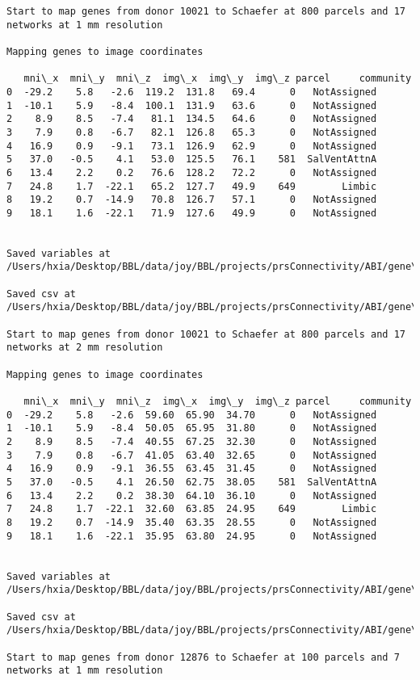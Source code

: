 \documentclass[11pt]{article}
\begin{document}
\begin{Verbatim}[commandchars=\\\{\}]
Start to map genes from donor 10021 to Schaefer at 800 parcels and 17 networks at 1 mm resolution

Mapping genes to image coordinates

   mni\_x  mni\_y  mni\_z  img\_x  img\_y  img\_z parcel     community
0  -29.2    5.8   -2.6  119.2  131.8   69.4      0   NotAssigned
1  -10.1    5.9   -8.4  100.1  131.9   63.6      0   NotAssigned
2    8.9    8.5   -7.4   81.1  134.5   64.6      0   NotAssigned
3    7.9    0.8   -6.7   82.1  126.8   65.3      0   NotAssigned
4   16.9    0.9   -9.1   73.1  126.9   62.9      0   NotAssigned
5   37.0   -0.5    4.1   53.0  125.5   76.1    581  SalVentAttnA
6   13.4    2.2    0.2   76.6  128.2   72.2      0   NotAssigned
7   24.8    1.7  -22.1   65.2  127.7   49.9    649        Limbic
8   19.2    0.7  -14.9   70.8  126.7   57.1      0   NotAssigned
9   18.1    1.6  -22.1   71.9  127.6   49.9      0   NotAssigned


Saved variables at /Users/hxia/Desktop/BBL/data/joy/BBL/projects/prsConnectivity/ABI/gene\_mapping/10021donor\_800Parcels\_17Network\_1mm.pkl

Saved csv at /Users/hxia/Desktop/BBL/data/joy/BBL/projects/prsConnectivity/ABI/gene\_mapping/10021donor\_800Parcels\_17Network\_1mm.csv

Start to map genes from donor 10021 to Schaefer at 800 parcels and 17 networks at 2 mm resolution

Mapping genes to image coordinates

   mni\_x  mni\_y  mni\_z  img\_x  img\_y  img\_z parcel     community
0  -29.2    5.8   -2.6  59.60  65.90  34.70      0   NotAssigned
1  -10.1    5.9   -8.4  50.05  65.95  31.80      0   NotAssigned
2    8.9    8.5   -7.4  40.55  67.25  32.30      0   NotAssigned
3    7.9    0.8   -6.7  41.05  63.40  32.65      0   NotAssigned
4   16.9    0.9   -9.1  36.55  63.45  31.45      0   NotAssigned
5   37.0   -0.5    4.1  26.50  62.75  38.05    581  SalVentAttnA
6   13.4    2.2    0.2  38.30  64.10  36.10      0   NotAssigned
7   24.8    1.7  -22.1  32.60  63.85  24.95    649        Limbic
8   19.2    0.7  -14.9  35.40  63.35  28.55      0   NotAssigned
9   18.1    1.6  -22.1  35.95  63.80  24.95      0   NotAssigned


Saved variables at /Users/hxia/Desktop/BBL/data/joy/BBL/projects/prsConnectivity/ABI/gene\_mapping/10021donor\_800Parcels\_17Network\_2mm.pkl

Saved csv at /Users/hxia/Desktop/BBL/data/joy/BBL/projects/prsConnectivity/ABI/gene\_mapping/10021donor\_800Parcels\_17Network\_2mm.csv

Start to map genes from donor 12876 to Schaefer at 100 parcels and 7 networks at 1 mm resolution


    \end{Verbatim}
\end{document}
